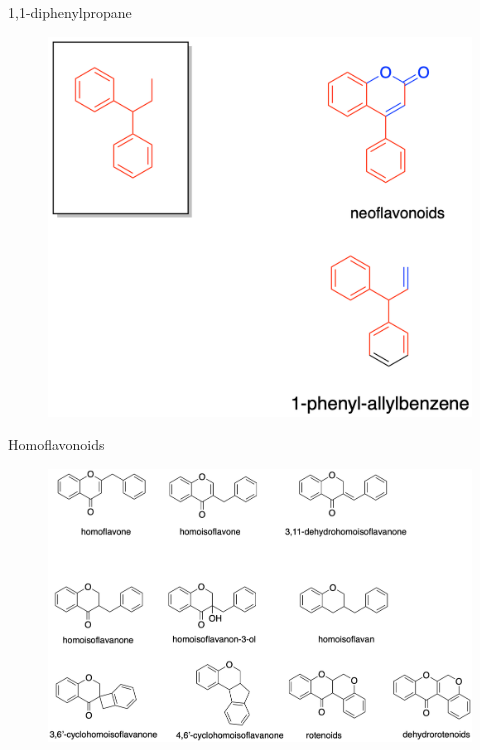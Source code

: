 \documentclass[11pt]{beamer}
\begin{document}
\begin{frame}{1,1-diphenylpropane}
	\begin{figure}
		\centering
		\includegraphics[scale=0.5]{1,1-diphenylpropane skeleton.png}
	\end{figure}
\end{frame}
\begin{frame}{Homoflavonoids}
	\begin{figure}
		\centering
		\includegraphics[scale=0.5]{homoflavonoids.png}
	\end{figure}
\end{frame}
\end{document}
